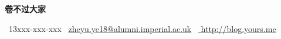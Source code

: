 \documentclass[11pt]{article}
\begin{document}

\centerline{\LARGE\bfseries{卷不过大家}}
\vspace{1ex}
\centerline{\normalsize{\faPhone\ 13xxx-xxx-xxx \quad \faEnvelopeO\ \href{mailto:zheyu.ye18@alumni.imperial.ac.uk}{zheyu.ye18@alumni.imperial.ac.uk} \quad \faHome\  \href{ http://blog.yours.me}{ http://blog.yours.me}}}




\end{document}

